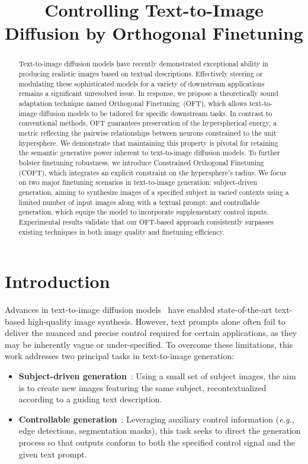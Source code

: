 \title{Controlling Text-to-Image Diffusion by Orthogonal Finetuning}

\begin{abstract}
Text-to-image diffusion models have recently demonstrated exceptional ability in producing realistic images based on textual descriptions. Effectively steering or modulating these sophisticated models for a variety of downstream applications remains a significant unresolved issue. In response, we propose a theoretically sound adaptation technique named Orthogonal Finetuning~(OFT), which allows text-to-image diffusion models to be tailored for specific downstream tasks. In contrast to conventional methods, OFT guarantees preservation of the hyperspherical energy, a metric reflecting the pairwise relationships between neurons constrained to the unit hypersphere. We demonstrate that maintaining this property is pivotal for retaining the semantic generative power inherent to text-to-image diffusion models. To further bolster finetuning robustness, we introduce Constrained Orthogonal Finetuning (COFT), which integrates an explicit constraint on the hypersphere's radius. We focus on two major finetuning scenarios in text-to-image generation: subject-driven generation, aiming to synthesize images of a specified subject in varied contexts using a limited number of input images along with a textual prompt; and controllable generation, which equips the model to incorporate supplementary control inputs. Experimental results validate that our OFT-based approach consistently surpasses existing techniques in both image quality and finetuning efficiency.
\end{abstract}

\section{Introduction}

Advances in text-to-image diffusion models~\cite{saharia2022photorealistic,ramesh2022hierarchical,rombach2022high} have enabled state-of-the-art text-based high-quality image synthesis. However, text prompts alone often fail to deliver the nuanced and precise control required for certain applications, as they may be inherently vague or under-specified. To overcome these limitations, this work addresses two principal tasks in text-to-image generation:

\begin{itemize}[leftmargin=*,nosep]

    \item \textbf{Subject-driven generation}~\cite{ruiz2023dreambooth}: Using a small set of subject images, the aim is to create new images featuring the same subject, recontextualized according to a guiding text description.
    \item \textbf{Controllable generation}~\cite{zhang2023adding,mou2023t2i}: Leveraging auxiliary control information (\emph{e.g.}, edge detections, segmentation masks), this task seeks to direct the generation process so that outputs conform to both the specified control signal and the given text prompt.
\end{itemize}

